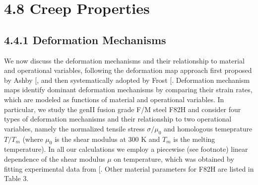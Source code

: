 \documentclass[letterpaper,10pt,english]{jupyterBook}
\begin{document}
	\section{4.8 Creep Properties}
	\label{\detokenize{4 Mechanical Properties:creep-properties}}
	
	\subsection{4.4.1 Deformation Mechanisms}
	\label{\detokenize{4 Mechanical Properties:deformation-mechanisms}}
	\sphinxAtStartPar
	We now discuss the deformation mechanisms and their relationship to material and operational variables, following the deformation map approach first proposed by Ashby {[}\sphinxhref{https://drive.google.com/file/d/1APELUCmPwMVPnGgeBDs-uroUFJODEYKi/view?usp=drive\_link}{Ashby1972}{]}, and then systematically adopted by Frost {[}\sphinxhref{https://defmech.engineering.dartmouth.edu}{Frost1982}{]}. Deformation mechanism maps identify dominant deformation mechanisms by comparing their strain rates, which are modeled as functions of material and operational variables. In particular, we study the gen\sphinxhyphen{}II fusion grade F/M steel F82H and consider four types of deformation mechanisms and their relationship to two operational variables, namely the normalized tensile stress \(\sigma/\mu_0\) and homologous temeprature \(T/T_m\) (where \(\mu_0\) is the shear modulus at 300 K and \(T_m\) is the melting temperature). In all our calculations we employ a piecewise (see footnote) linear dependence of the shear modulus \(\mu\) on temperature, which was obtained by fitting experimental data from {[}\sphinxhref{https://drive.google.com/file/d/1cXD\_EOWo2I41GUUky344DpJtV\_nshKT5/view?usp=drive\_link}{Shiba1996}{]}. Other material parameters for F82H are listed in Table 3.
	
\end{document}
